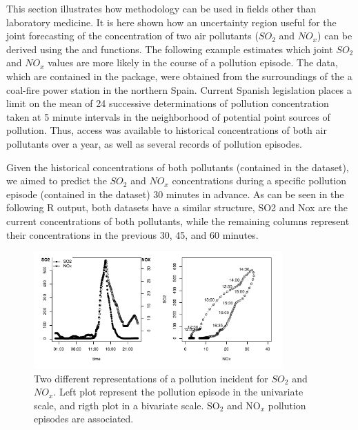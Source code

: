 This section illustrates how  methodology can be used in fields other than laboratory medicine. It is here shown how an uncertainty region useful for the joint forecasting of the concentration of two air pollutants ($SO_2$ and $NO_x$) can be derived using the  and  functions. The following example estimates which joint $SO_2$ and $NO_x$ values are more likely in the course of a pollution episode. The data, which are contained in the package, were obtained from the surroundings of the a coal-fire power station in the northern Spain. Current Spanish legislation places a limit on the mean of 24 successive determinations of pollution concentration taken at 5 minute intervals in the neighborhood of potential point sources of pollution. Thus, access was available to historical concentrations of both air pollutants over a year, as well as several records of pollution episodes.

Given the historical concentrations of both pollutants (contained in the  dataset), we aimed to predict the $SO_2$ and $NO_x$ concentrations during a specific pollution episode (contained in the  dataset) 30 minutes in advance. As can be seen in the following R output, both datasets have a similar structure, SO2 and Nox are the current concentrations of both pollutants, while the remaining columns represent their concentrations in the previous 30, 45, and 60 minutes.

\begin{figure}[!htb]
	\centering
	\includegraphics[width = 0.85\textwidth]{Fig7.pdf}
	\caption{Two different representations of a pollution incident for $SO_2$ and $NO_x$. Left plot represent the pollution episode in the univariate scale, and rigth plot in a bivariate scale. SO$_2$ and NO$_x$ pollution episodes are associated.}
	\label{episode}
\end{figure}




